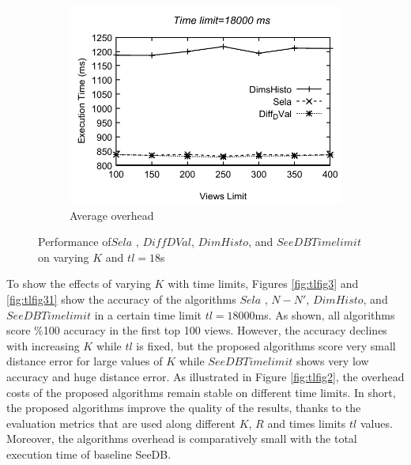 \begin{figure}[t]
\begin{subfigure}[b]{0.32\textwidth}
    \includegraphics[width=\textwidth]{tl4.pdf}
     \caption{Average overhead}
       \label{fig:tlfig4}%
  \end{subfigure}
  \caption{Performance of$Sela$ , $Diff DVal$, $DimHisto$, and $SeeDB Timelimit$ on varying $K$ and $tl=18$s}
\end{figure}
%
To show the effects of varying $K$ with time limits, Figures \ref{fig:tlfig3} and \ref{fig:tlfig31} show the accuracy of the 
algorithms $Sela$ , $N-N'$, $DimHisto$, and $SeeDB Timelimit$ in a certain time limit $tl=18000$ms.
%
As shown, all algorithms score \%100 accuracy in the first top 100 views. 
%
However, the accuracy declines with increasing $K$ while $tl$ is fixed, but the proposed algorithms score very small distance error for large values of $K$ while $SeeDB Timelimit$ shows very low accuracy and huge distance error. 
%
As illustrated in Figure \ref{fig:tlfig2}, the overhead costs of the proposed algorithms remain stable on different time limits. 
In short, the proposed algorithms improve the quality of the results, thanks to the evaluation metrics that are used along different $K$, $R$ and times limits $tl$ values. 
%
Moreover, the algorithms overhead is comparatively small with the total execution time of baseline SeeDB.
